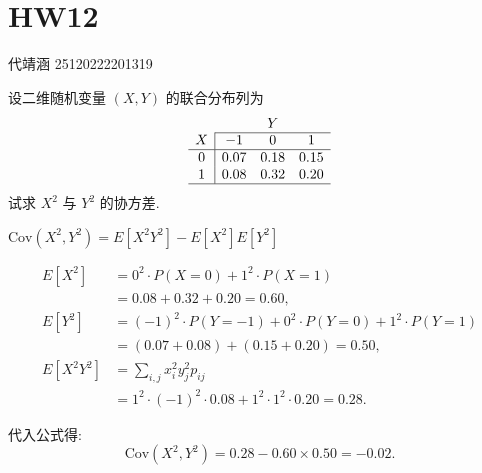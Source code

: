 \documentclass[../main.tex]{subfiles}
\begin{document}
\ifSubfilesClassLoaded{

    
    \setcounter{chapter}{11}
}{}

\chapter{ HW12 }
代靖涵 25120222201319
\begin{exercise}{}{}
设二维随机变量 $(X,Y)$ 的联合分布列为
$$\begin{array}{c|ccc}
\multicolumn{1}{c}{} & \multicolumn{3}{c}{Y}\\
\cline{2-4}
X & -1 & 0 & 1\\
\hline
0 & 0.07 & 0.18 & 0.15\\
1 & 0.08 & 0.32 & 0.20\\
\hline
\end{array}$$
试求 $X^2$ 与 $Y^2$ 的协方差.
\end{exercise}

\begin{solution}
   
\(\text{Cov}(X^2, Y^2) = E[X^2 Y^2] - E[X^2]E[Y^2]\)

\[
\begin{aligned}
E[X^2] &= 0^2 \cdot P(X=0) + 1^2 \cdot P(X=1) \\
&= 0.08 + 0.32 + 0.20 = 0.60, \\[6pt]
E[Y^2] &= (-1)^2 \cdot P(Y=-1) + 0^2 \cdot P(Y=0) + 1^2 \cdot P(Y=1) \\
&= (0.07 + 0.08) + (0.15 + 0.20) = 0.50, \\[6pt]
E[X^2 Y^2] &= \sum_{i,j} x_i^2 y_j^2 p_{ij} \\
&= 1^2 \cdot (-1)^2 \cdot 0.08 + 1^2 \cdot 1^2 \cdot 0.20 = 0.28.
\end{aligned}
\]

代入公式得:
\[
\text{Cov}(X^2, Y^2) = 0.28 - 0.60 \times 0.50 = -0.02.
\]
\end{solution}
\end{document}

